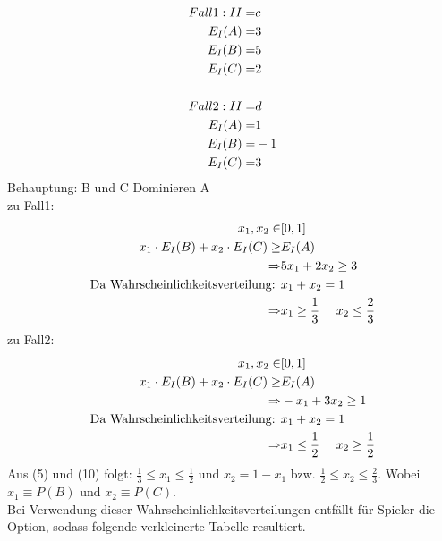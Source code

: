 \documentclass[a4paper, 11pt]{article}
\newcommand{\RM}[1]{\MakeUppercase{\romannumeral #1}}
\begin{document}
\begin{align*}
	Fall1: \RM{2} =  & c\\
	E_\RM{1}(A) = & 3\\
	E_\RM{1}(B) = & 5\\
	E_\RM{1}(C) = & 2\\
	\\
	Fall2: \RM{2} = & d\\
	E_\RM{1}(A) = & 1\\
	E_\RM{1}(B) = & -1\\
	E_\RM{1}(C) = & 3\\
\end{align*}
Behauptung: B und C Dominieren A\\
zu Fall1:
\begin{align}
	x_1,x_2 \in & [0,1]\\
	x_1 \cdot E_\RM{1}(B) + x_2 \cdot E_\RM{1}(C) \geq & E_\RM{1}(A)\\
	\Rightarrow & 5x_1 + 2x_2 \geq 3\\ 
	\text{Da Wahrscheinlichkeitsverteilung:  } & x_1 + x_2 = 1\\
	\Rightarrow & x_1 \geq \frac{1}{3}~~~~ x_2 \leq \frac{2}{3} 
\end{align}
zu Fall2:
\begin{align}
	x_1,x_2 \in & [0,1]\\
	x_1 \cdot E_\RM{1}(B) + x_2 \cdot E_\RM{1}(C) \geq & E_\RM{1}(A)\\
	\Rightarrow & -x_1 + 3x_2 \geq 1\\ 
	\text{Da Wahrscheinlichkeitsverteilung:  } & x_1 + x_2 = 1\\
	\Rightarrow & x_1 \leq \frac{1}{2}~~~~ x_2 \geq \frac{1}{2} 
\end{align}
Aus (5) und (10) folgt:  $\frac{1}{3} \leq x_1 \leq \frac{1}{2}$ und $x_2 = 1-x_1$ bzw. $\frac{1}{2} \leq x_2 \leq \frac{2}{3}$. Wobei $x_1 \equiv P(B)$ und $x_2 \equiv P(C) $. \\
Bei Verwendung dieser Wahrscheinlichkeitsverteilungen entfällt für Spieler \RM{1} die Option, sodass folgende verkleinerte Tabelle resultiert.\\
\end{document}

